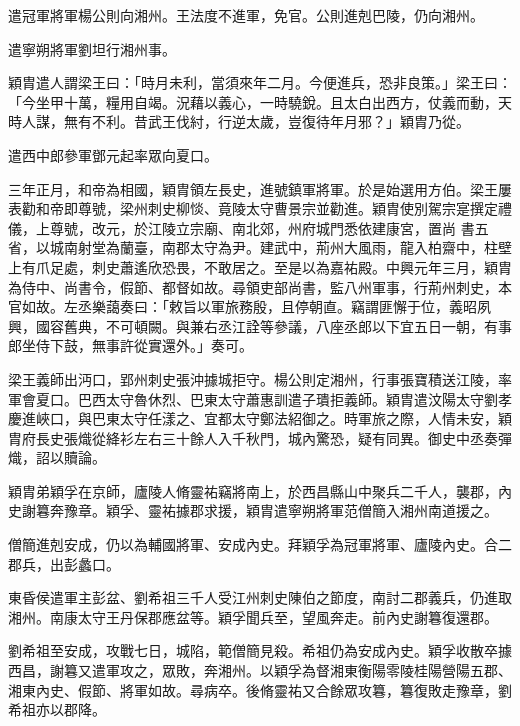 \begin{pinyinscope}
 遣冠軍將軍楊公則向湘州。王法度不進軍，免官。公則進剋巴陵，仍向湘州。



 遣寧朔將軍劉坦行湘州事。



 穎胄遣人謂梁王曰：「時月未利，當須來年二月。今便進兵，恐非良策。」梁王曰：「今坐甲十萬，糧用自竭。況藉以義心，一時驍銳。且太白出西方，仗義而動，天時人謀，無有不利。昔武王伐紂，行逆太歲，豈復待年月邪？」穎胄乃從。



 遣西中郎參軍鄧元起率眾向夏口。



 三年正月，和帝為相國，穎胄領左長史，進號鎮軍將軍。於是始選用方伯。梁王屢表勸和帝即尊號，梁州刺史柳惔、竟陵太守曹景宗並勸進。穎胄使別駕宗寔撰定禮儀，上尊號，改元，於江陵立宗廟、南北郊，州府城門悉依建康宮，置尚
 書五省，以城南射堂為蘭臺，南郡太守為尹。建武中，荊州大風雨，龍入柏齋中，柱壁上有爪足處，刺史蕭遙欣恐畏，不敢居之。至是以為嘉祐殿。中興元年三月，穎胄為侍中、尚書令，假節、都督如故。尋領吏部尚書，監八州軍事，行荊州刺史，本官如故。左丞樂藹奏曰：「敕旨以軍旅務殷，且停朝直。竊謂匪懈于位，義昭夙興，國容舊典，不可頓闕。與兼右丞江詮等參議，八座丞郎以下宜五日一朝，有事郎坐侍下鼓，無事許從實還外。」奏可。



 梁王義師出沔口，郢州刺史張沖據城拒守。楊公則定湘州，行事張寶積送江陵，率軍會夏口。巴西太守魯休烈、巴東太守蕭惠訓遣子璝拒義師。穎胄遣汶陽太守劉孝慶進峽口，與巴東太守任漾之、宜都太守鄭法紹御之。時軍旅之際，人情未安，穎胄府長史張熾從絳衫左右三十餘人入千秋門，城內驚恐，疑有同異。御史中丞奏彈熾，詔以贖論。



 穎胄弟穎孚在京師，廬陵人脩靈祐竊將南上，於西昌縣山中聚兵二千人，襲郡，內史謝篹奔豫章。穎孚、靈祐據郡求援，穎胄遣寧朔將軍范僧簡入湘州南道援之。



 僧簡進剋安成，仍以為輔國將軍、安成內史。拜穎孚為冠軍將軍、廬陵內史。合二郡兵，出彭蠡口。



 東昏侯遣軍主彭盆、劉希祖三千人受江州刺史陳伯之節度，南討二郡義兵，仍進取湘州。南康太守王丹保郡應盆等。穎孚聞兵至，望風奔走。前內史謝篹復還郡。



 劉希祖至安成，攻戰七日，城陷，範僧簡見殺。希祖仍為安成內史。穎孚收散卒據西昌，謝篹又遣軍攻之，眾敗，奔湘州。以穎孚為督湘東衡陽零陵桂陽營陽五郡、湘東內史、假節、將軍如故。尋病卒。後脩靈祐又合餘眾攻篹，篹復敗走豫章，劉希祖亦以郡降。




\end{pinyinscope}
